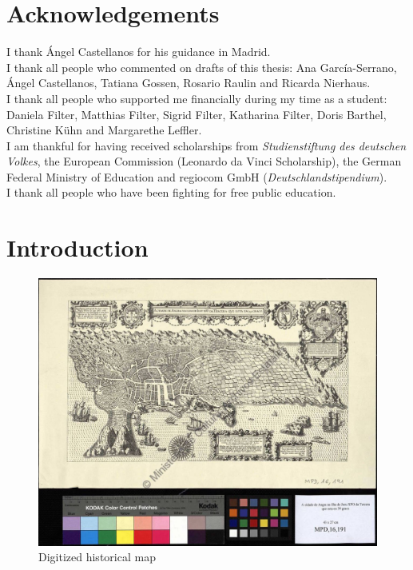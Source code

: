 \documentclass[11pt]{report}
\begin{document}
\newpage
\thispagestyle{empty}
\mbox{}

\chapter*{Acknowledgements}
I thank Ángel Castellanos for his guidance in Madrid.\\

I thank all people who commented on drafts of this thesis: Ana García-Serrano, Ángel Castellanos, Tatiana Gossen, Rosario Raulin and Ricarda Nierhaus. \\

I thank all people who supported me financially during my time as a student: Daniela Filter, Matthias Filter, Sigrid Filter, Katharina Filter, Doris Barthel, Christine Kühn and Margarethe Leffler. \\

I am thankful for having received scholarships from \textit{Studienstiftung des deutschen Volkes}, the European Commission (Leonardo da Vinci Scholarship), the German Federal Ministry of Education and regiocom GmbH (\textit{Deutschlandstipendium}).\\

I thank all people who have been fighting for free public education.

\newpage
\thispagestyle{empty}
\mbox{}

\tableofcontents
\newpage

\listoffigures

\printglossary

\newpage
\thispagestyle{empty}
\mbox{}

\chapter{Introduction}
\label{Introduction}

\renewcommand{\thepage}{\arabic{page}}
\setcounter{page}{1}

\begin{figure}[!ht]
	\centering
	\includegraphics[width=\linewidth]{./images/map}
\caption{Digitized historical map}
\label{figure:map}
\end{figure}
\end{document}

